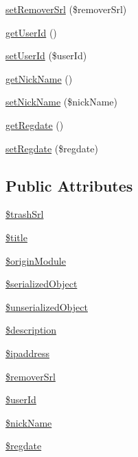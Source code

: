 \begin{DoxyCompactItemize}
\item 
\hyperlink{classTrashVO_a3bd22cfa2e432561f1fc50dfcdeb4983}{set\+Remover\+Srl} (\$remover\+Srl)
\item 
\hyperlink{classTrashVO_a2e999529c316982b83362d5e3af98675}{get\+User\+Id} ()
\item 
\hyperlink{classTrashVO_a170dc90ea1fec615ccc7aef649f89390}{set\+User\+Id} (\$user\+Id)
\item 
\hyperlink{classTrashVO_aba10424cba71a92cca060b6683f4f3af}{get\+Nick\+Name} ()
\item 
\hyperlink{classTrashVO_a27720ec735924373fea7f6aeea738892}{set\+Nick\+Name} (\$nick\+Name)
\item 
\hyperlink{classTrashVO_ac7de0db59f33f9c3db7410cc54432c5b}{get\+Regdate} ()
\item 
\hyperlink{classTrashVO_ac23c4bcbc9167b243f7f292190e35cb8}{set\+Regdate} (\$regdate)
\end{DoxyCompactItemize}
\subsection*{Public Attributes}
\begin{DoxyCompactItemize}
\item 
\hyperlink{classTrashVO_a8aeea2d547b7a335d987bcf4369a969c}{\$trash\+Srl}
\item 
\hyperlink{classTrashVO_ac6f85be76ea94f3fde44e0527bdcadc1}{\$title}
\item 
\hyperlink{classTrashVO_ad977787e04708af64f4c9d4891d3f682}{\$origin\+Module}
\item 
\hyperlink{classTrashVO_ac3834ed43d01357398d5a0d7f5a9c698}{\$serialized\+Object}
\item 
\hyperlink{classTrashVO_a43048c60bc9505999742be271b5d9385}{\$unserialized\+Object}
\item 
\hyperlink{classTrashVO_abf2e10398265d4954a9e23f06b29a190}{\$description}
\item 
\hyperlink{classTrashVO_add9ea842dcdbcd81a3fef932cd622e18}{\$ipaddress}
\item 
\hyperlink{classTrashVO_aa51410763a3b44a76853d8a347793903}{\$remover\+Srl}
\item 
\hyperlink{classTrashVO_a346f371317bde03b5a209e00cb33a603}{\$user\+Id}
\item 
\hyperlink{classTrashVO_a8084a8637a7a98cc7f1182bd7b86e5de}{\$nick\+Name}
\item 
\hyperlink{classTrashVO_a54388f0f415f3e5c302eec871e790434}{\$regdate}
\end{DoxyCompactItemize}


